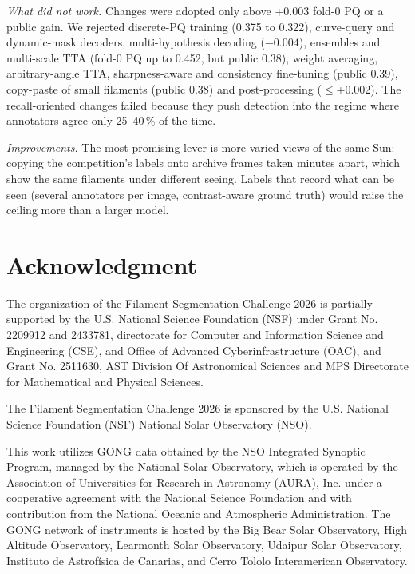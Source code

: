 \documentclass[sigconf]{acmart}
\begin{document}
\emph{What did not work.} Changes were adopted only above +0.003 fold-0 PQ or a public gain. We rejected discrete-PQ training (0.375 to 0.322), curve-query and dynamic-mask decoders, multi-hypothesis decoding ($-0.004$), ensembles and multi-scale TTA (fold-0 PQ up to 0.452, but public 0.38), weight averaging, arbitrary-angle TTA, sharpness-aware and consistency fine-tuning (public 0.39), copy-paste of small filaments (public 0.38) and post-processing ($\le$+0.002). The recall-oriented changes failed because they push detection into the regime where annotators agree only 25--40\,\% of the time.

\emph{Improvements.} The most promising lever is more varied views of the same Sun: copying the competition's labels onto archive frames taken minutes apart, which show the same filaments under different seeing. Labels that record what can be seen (several annotators per image, contrast-aware ground truth) would raise the ceiling more than a larger model.


\section{Acknowledgment}\label{sec:acknowledgment}
    The organization of the Filament Segmentation Challenge 2026 is partially supported by the U.S. National Science Foundation (NSF) under Grant No. 2209912 and 2433781, directorate for Computer and Information Science and Engineering (CSE), and Office of Advanced Cyberinfrastructure (OAC), and Grant No. 2511630, AST Division Of Astronomical Sciences and MPS Directorate for Mathematical and Physical Sciences.

    The Filament Segmentation Challenge 2026 is sponsored by the U.S. National Science Foundation (NSF) National Solar Observatory (NSO).

    This work utilizes GONG data obtained by the NSO Integrated Synoptic Program, managed by the National Solar Observatory, which is operated by the Association of Universities for Research in Astronomy (AURA), Inc. under a cooperative agreement with the National Science Foundation and with contribution from the National Oceanic and Atmospheric Administration. The GONG network of instruments is hosted by the Big Bear Solar Observatory, High Altitude Observatory, Learmonth Solar Observatory, Udaipur Solar Observatory, Instituto de Astrofísica de Canarias, and Cerro Tololo Interamerican Observatory.



\end{document}
